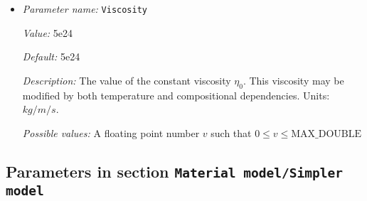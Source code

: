 \begin{itemize}
{\it Value:} 0.0


{\it Default:} 0.0


{\it Description:} The temperature dependence of viscosity. Dimensionless exponent. See the general documentation of this model for a formula that states the dependence of the viscosity on this factor, which is called $\beta$ there.


{\it Possible values:} A floating point number $v$ such that $0 \leq v \leq \text{MAX\_DOUBLE}$
\item {\it Parameter name:} {\tt Viscosity}
\label{parameters:Material model/Simple model/Viscosity}
\label{parameters:Material_20model/Simple_20model/Viscosity}


{\it Value:} 5e24


{\it Default:} 5e24


{\it Description:} The value of the constant viscosity $\eta_0$. This viscosity may be modified by both temperature and compositional dependencies. Units: $kg/m/s$.


{\it Possible values:} A floating point number $v$ such that $0 \leq v \leq \text{MAX\_DOUBLE}$
\end{itemize}

\subsection{Parameters in section \tt Material model/Simpler model}
\label{parameters:Material_20model/Simpler_20model}

